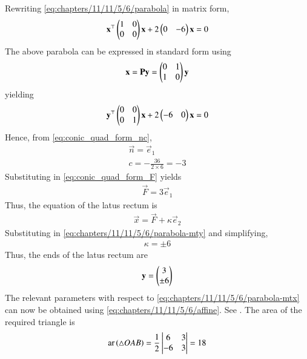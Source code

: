 		Rewriting \eqref{eq:chapters/11/11/5/6/parabola} in matrix form,
    \begin{align}
        \mathbf{x}^\top\begin{pmatrix}1&0\\0&0\end{pmatrix}\mathbf{x} + 2\begin{pmatrix}0&-6\end{pmatrix}\mathbf{x} = 0
        \label{eq:chapters/11/11/5/6/parabola-mtx}
    \end{align}
    The above parabola can be  expressed in standard form using 
\begin{align}
	\mathbf{x} = \mathbf{P}\mathbf{y} = \begin{pmatrix}0 & 1 \\ 1 & 0\end{pmatrix}\mathbf{y}
        \label{eq:chapters/11/11/5/6/affine}
\end{align}
yielding
    \begin{align}
        \mathbf{y}^\top\begin{pmatrix}0&0\\0&1\end{pmatrix}\mathbf{x} + 2\begin{pmatrix}-6&0\end{pmatrix}\mathbf{x} = 0
        \label{eq:chapters/11/11/5/6/parabola-mty}
    \end{align}
    Hence, 
    from
\eqref{eq:conic_quad_form_nc}, 
    \begin{align}
	    \vec{n} = \vec{e}_1
        \label{eq:chapters/11/11/5/6/n}
	\\
	    c = -\frac{36}{2\times 6} = -3
    \end{align}
    Substituting in 
  \eqref{eq:conic_quad_form_F} 
  yields
    \begin{align}
        \vec{F} = 3\vec{e}_1
    \end{align}
    Thus, the equation of the latus rectum is
\begin{align}
        \vec{x} = \vec{F} + \kappa \vec{e}_2
        \label{eq:chapters/11/11/5/6/x-general}
    \end{align}
        Substituting in \eqref{eq:chapters/11/11/5/6/parabola-mty} and simplifying,
    \begin{align}
\kappa = \pm 6
        \label{eq:chapters/11/11/5/6/x-latus}
    \end{align}
    Thus, the ends of the latus rectum are
    \begin{align}
        \mathbf{y} = \begin{pmatrix}3 \\ \pm 6\end{pmatrix}
    \end{align}
    The relevant parameters with respect to 
        \eqref{eq:chapters/11/11/5/6/parabola-mtx}
	can now be obtained using 
        \eqref{eq:chapters/11/11/5/6/affine}.
See .
The area of the required triangle is
    \begin{align}
        \textrm{ar}\left(\triangle OAB\right) = \frac{1}{2}\begin{vmatrix}6&3\\-6&3\end{vmatrix} = 18 
    \end{align}
